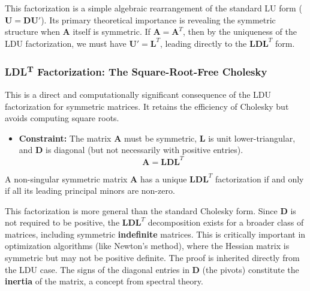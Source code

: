 \begin{remark}
This factorization is a simple algebraic rearrangement of the standard LU form ($\mathbf{U} = \mathbf{D}\mathbf{U}'$). Its primary theoretical importance is revealing the symmetric structure when $\mathbf{A}$ itself is symmetric. If $\mathbf{A} = \mathbf{A}^T$, then by the uniqueness of the LDU factorization, we must have $\mathbf{U}' = \mathbf{L}^T$, leading directly to the $\mathbf{L}\mathbf{D}\mathbf{L}^T$ form.
\end{remark}

\subsubsection{LDL\textsuperscript{T} Factorization: The Square-Root-Free Cholesky}
This is a direct and computationally significant consequence of the LDU factorization for symmetric matrices. It retains the efficiency of Cholesky but avoids computing square roots.

\begin{itemize}
    \item \textbf{Constraint:} The matrix $\mathbf{A}$ must be symmetric, $\mathbf{L}$ is unit lower-triangular, and $\mathbf{D}$ is diagonal (but not necessarily with positive entries).
    \[ \mathbf{A} = \mathbf{L}\mathbf{D}\mathbf{L}^T \]
\end{itemize}

\begin{theorem}
A non-singular symmetric matrix $\mathbf{A}$ has a unique $\mathbf{L}\mathbf{D}\mathbf{L}^T$ factorization if and only if all its leading principal minors are non-zero.
\end{theorem}

\begin{remark}
This factorization is more general than the standard Cholesky form. Since $\mathbf{D}$ is not required to be positive, the $\mathbf{L}\mathbf{D}\mathbf{L}^T$ decomposition exists for a broader class of matrices, including symmetric \textbf{indefinite} matrices. This is critically important in optimization algorithms (like Newton's method), where the Hessian matrix is symmetric but may not be positive definite. The proof is inherited directly from the LDU case. The signs of the diagonal entries in $\mathbf{D}$ (the pivots) constitute the \textbf{inertia} of the matrix, a concept from spectral theory.
\end{remark}

